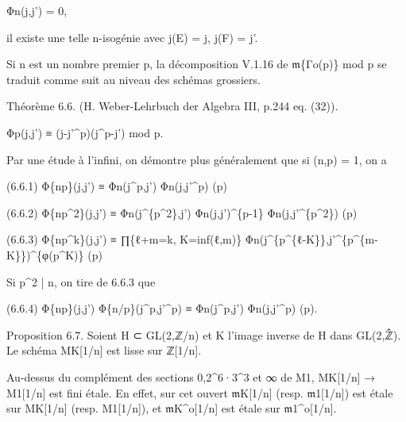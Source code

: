 \documentclass[11pt,a4paper]{article}
\begin{document}
Φ\textunderscore{}n(j,j') = 0,

il existe une telle n-isogénie avec j(E) = j, j(F) = j'.

Si n est un nombre premier p, la décomposition V.1.16 de \ensuremath{\mathfrak{m}}\textunderscore{}\{Γ\textunderscore{}o(p)\} mod p se traduit comme suit au niveau des schémas grossiers.

Théorème 6.6. (H. Weber-Lehrbuch der Algebra III, p.244 eq. (32)).

Φ\textunderscore{}p(j,j') ≡ (j-j'\textasciicircum{}p)(j\textasciicircum{}p-j') mod p.

Par une étude à l'infini, on démontre plus généralement que si (n,p) = 1, on a

(6.6.1)        Φ\textunderscore{}\{np\}(j,j') ≡ Φ\textunderscore{}n(j\textasciicircum{}p,j') Φ\textunderscore{}n(j,j'\textasciicircum{}p)        (p)

(6.6.2)        Φ\textunderscore{}\{np\textasciicircum{}2\}(j,j') ≡ Φ\textunderscore{}n(j\textasciicircum{}\{p\textasciicircum{}2\},j') Φ\textunderscore{}n(j,j')\textasciicircum{}\{p-1\} Φ\textunderscore{}n(j,j'\textasciicircum{}\{p\textasciicircum{}2\})        (p)

(6.6.3)        Φ\textunderscore{}\{np\textasciicircum{}k\}(j,j') ≡ ∏\textunderscore{}\{ℓ+m=k, K=inf(ℓ,m)\} Φ\textunderscore{}n(j\textasciicircum{}\{p\textasciicircum{}\{ℓ-K\}\},j'\textasciicircum{}\{p\textasciicircum{}\{m-K\}\})\textasciicircum{}\{φ(p\textasciicircum{}K)\}        (p)

Si p\textasciicircum{}2 | n, on tire de 6.6.3 que

(6.6.4)        Φ\textunderscore{}\{np\}(j,j') Φ\textunderscore{}\{n/p\}(j\textasciicircum{}p,j'\textasciicircum{}p) ≡ Φ\textunderscore{}n(j\textasciicircum{}p,j') Φ\textunderscore{}n(j,j'\textasciicircum{}p)        (p).

Proposition 6.7. Soient H ⊂ GL(2,ℤ/n) et K l'image inverse de H dans GL(2,ℤ̂). Le schéma M\textunderscore{}K[1/n] est lisse sur ℤ[1/n].

Au-dessus du complément des sections 0,2\textasciicircum{}6·3\textasciicircum{}3 et ∞ de M\textunderscore{}1, M\textunderscore{}K[1/n] → M\textunderscore{}1[1/n] est fini étale. En effet, sur cet ouvert \ensuremath{\mathfrak{m}}\textunderscore{}K[1/n] (resp. \ensuremath{\mathfrak{m}}\textunderscore{}1[1/n]) est étale sur M\textunderscore{}K[1/n] (resp. M\textunderscore{}1[1/n]), et \ensuremath{\mathfrak{m}}\textunderscore{}K\textasciicircum{}o[1/n] est étale sur \ensuremath{\mathfrak{m}}\textunderscore{}1\textasciicircum{}o[1/n].
\end{document}

